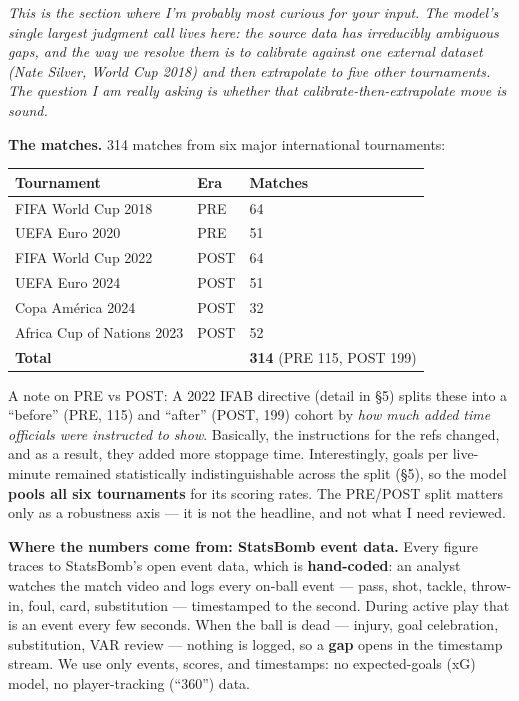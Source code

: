 \documentclass[
]{article}
\begin{document}
\emph{This is the section where I'm probably most curious for your
input. The model's single largest judgment call lives here: the source
data has irreducibly ambiguous gaps, and the way we resolve them is to
calibrate against one external dataset (Nate Silver, World Cup 2018) and
then extrapolate to five other tournaments. The question I am really
asking is whether that calibrate-then-extrapolate move is sound.}

\textbf{The matches.} 314 matches from six major international
tournaments:

\begin{longtable}[]{@{}lll@{}}
\toprule\noalign{}
Tournament & Era & Matches \\
\midrule\noalign{}
\endhead
\bottomrule\noalign{}
\endlastfoot
FIFA World Cup 2018 & PRE & 64 \\
UEFA Euro 2020 & PRE & 51 \\
FIFA World Cup 2022 & POST & 64 \\
UEFA Euro 2024 & POST & 51 \\
Copa América 2024 & POST & 32 \\
Africa Cup of Nations 2023 & POST & 52 \\
\textbf{Total} & & \textbf{314} (PRE 115, POST 199) \\
\end{longtable}

A note on PRE vs POST: A 2022 IFAB directive (detail in §5) splits these
into a ``before'' (PRE, 115) and ``after'' (POST, 199) cohort by
\emph{how much added time officials were instructed to show}. Basically,
the instructions for the refs changed, and as a result, they added more
stoppage time. Interestingly, goals per live-minute remained
statistically indistinguishable across the split (§5), so the model
\textbf{pools all six tournaments} for its scoring rates. The PRE/POST
split matters only as a robustness axis --- it is not the headline, and
not what I need reviewed.

\textbf{Where the numbers come from: StatsBomb event data.} Every figure
traces to StatsBomb's open event data, which is \textbf{hand-coded}: an
analyst watches the match video and logs every on-ball event --- pass,
shot, tackle, throw-in, foul, card, substitution --- timestamped to the
second. During active play that is an event every few seconds. When the
ball is dead --- injury, goal celebration, substitution, VAR review ---
nothing is logged, so a \textbf{gap} opens in the timestamp stream. We
use only events, scores, and timestamps: no expected-goals (xG) model,
no player-tracking (``360'') data.
\end{document}

